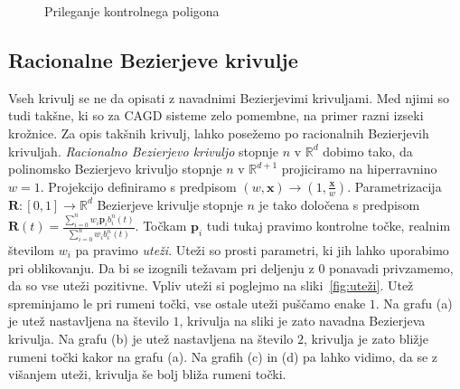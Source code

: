 \documentclass[isrm2, tisk]{fmfdelo}
\newcommand{\R}{\mathbb R}
\newcommand{\p}{\textbf{p}}
\begin{document}
    \begin{figure}[h]
        \centering
        \qquad
        \caption{Prileganje kontrolnega poligona}
        \label{fig:višanje-poligon}
    \end{figure}

    \subsection{Racionalne Bezierjeve krivulje}
    Vseh krivulj se ne da opisati z navadnimi Bezierjevimi krivuljami.
    Med njimi so tudi takšne, ki so za CAGD sisteme zelo pomembne, na primer razni izseki krožnice.
    Za opis takšnih krivulj, lahko posežemo po racionalnih Bezierjevih krivuljah.
    \textit{Racionalno Bezierjevo krivuljo} stopnje $n$ v $\R^d$ dobimo tako, da polinomsko Bezierjevo krivuljo stopnje $n$ v $\R^{d+1}$ projiciramo na hiperravnino $w=1$.
    Projekcijo definiramo s predpisom $(w,\mathbf{x})\to(1,\frac{\mathbf{x}}{w})$.
    Parametrizacija $\mathbf{R}:[0,1]\to \R^d$ Bezierjeve krivulje stopnje $n$ je tako določena s predpisom $\mathbf{R}(t) = \frac{\sum^{n}_{i=0}w_i\p_i b^n_i(t)}{\sum^{n}_{i=0}w_i b^n_i(t)}$.
    Točkam $\p_i$ tudi tukaj pravimo kontrolne točke, realnim številom $w_i$ pa pravimo \textit{uteži}.
    Uteži so prosti parametri, ki jih lahko uporabimo pri oblikovanju.
    Da bi se izognili težavam pri deljenju z $0$ ponavadi privzamemo, da so vse uteži pozitivne.
    Vpliv uteži si poglejmo na sliki~\ref{fig:uteži}.
    Utež spreminjamo le pri rumeni točki, vse ostale uteži puščamo enake $1$.
    Na grafu (a) je utež nastavljena na število $1$, krivulja na sliki je zato navadna Bezierjeva krivulja.
    Na grafu (b) je utež nastavljena na število $2$, krivulja je zato bližje rumeni točki kakor na grafu (a).
    Na grafih (c) in (d) pa lahko vidimo, da se z višanjem uteži, krivulja še bolj bliža rumeni točki.
\end{document}
